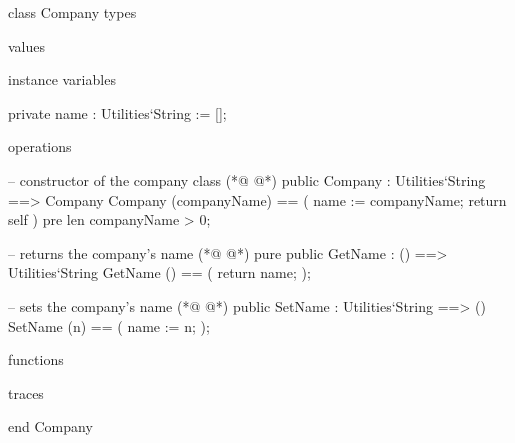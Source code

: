 \begin{vdmpp}[breaklines=true]
class Company
types

values

instance variables

 private name : Utilities`String := [];
 
operations

 -- constructor of the company class 
(*@
\label{Company:13}
@*)
  public Company :  Utilities`String ==> Company
    Company (companyName) == (
     name := companyName;
     return self
    )
    pre len companyName > 0;
    
  -- returns the company's name
(*@
\label{GetName:21}
@*)
  pure public GetName : () ==> Utilities`String
    GetName () == (
     return name;
    );
    
   -- sets the company's name
(*@
\label{SetName:27}
@*)
  public SetName : Utilities`String ==> ()
    SetName (n) == (
     name := n;
    );
    
functions

traces

end Company
\end{vdmpp}

